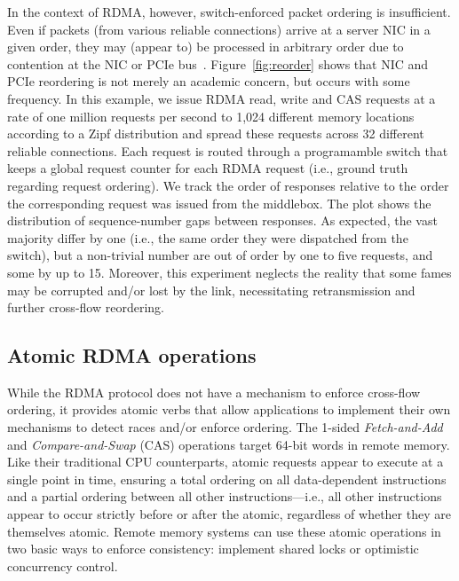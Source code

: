 
In the context of RDMA, however, switch-enforced packet ordering is
insufficient.  Even if packets (from various reliable connections)
arrive at a server NIC in a given order, they may (appear to) be
processed in arbitrary order due to contention at the NIC or PCIe
bus~\cite{understanding-pcie}. Figure~\ref{fig:reorder} shows that NIC
and PCIe reordering is not merely an academic concern, but occurs with
some frequency.  In this example, we issue RDMA read, write and CAS
requests at a rate of one million requests per second to 1,024
different memory locations according to a Zipf distribution and spread
these requests across 32 different reliable connections. Each request is routed
through a programamble switch that keeps a global request counter for
each RDMA request (i.e., ground truth regarding request ordering). We
track the order of responses relative to the order the corresponding
request was issued from the middlebox. The plot shows the distribution
of sequence-number gaps between responses. As expected, the vast
majority differ by one (i.e., the same order they were dispatched from
the switch), but a non-trivial number are out of order by one to five
requests, and some by up to 15.  Moreover, this experiment neglects
the reality that some fames may be corrupted and/or lost by the link,
necessitating retransmission and further cross-flow reordering.






\subsection{Atomic RDMA operations} 

While the RDMA protocol does not have a mechanism to enforce
cross-flow ordering, it provides atomic verbs that allow applications
to implement their own mechanisms to detect races and/or enforce
ordering.  The 1-sided \textit{Fetch-and-Add} and
\textit{Compare-and-Swap} (CAS) operations target 64-bit words in
remote memory.  Like their traditional CPU counterparts, atomic
requests appear to execute at a single point in time, ensuring a total
ordering on all data-dependent instructions and a partial ordering
between all other instructions---i.e., all other instructions appear
to occur strictly before or after the atomic, regardless of whether
they are themselves atomic.  Remote memory systems can use these
atomic operations in two basic ways to enforce consistency: implement
shared locks or optimistic concurrency control.

